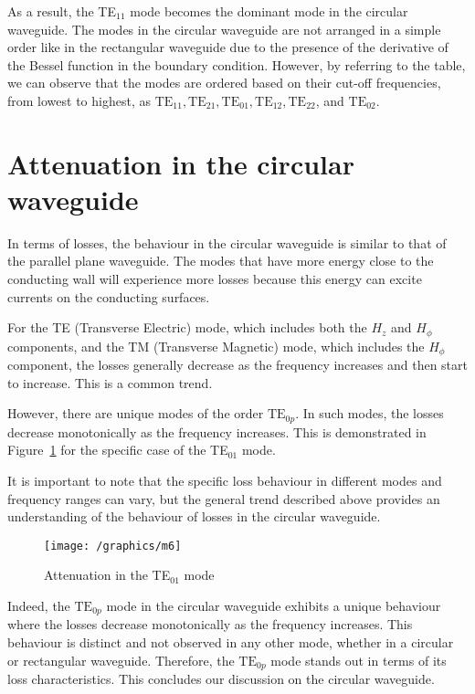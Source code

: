 As a result, the TE$_{11}$ mode becomes the dominant mode in the circular waveguide. The modes in the circular waveguide are not arranged in a simple order like in the rectangular waveguide due to the presence of the derivative of the Bessel function in the boundary condition. However, by referring to the table, we can observe that the modes are ordered based on their cut-off frequencies, from lowest to highest, as $\text{TE}_{11}, \text{TE}_{21}, \text{TE}_{01}, \text{TE}_{12}, \text{TE}_{22}$, and $\text{TE}_{02}$.

\section{Attenuation in the circular waveguide}
In terms of losses, the behaviour in the circular waveguide is similar to that of the parallel plane waveguide. The modes that have more energy close to the conducting wall will experience more losses because this energy can excite currents on the conducting surfaces. 

For the TE (Transverse Electric) mode, which includes both the $H_z$ and $H_\phi$ components, and the TM (Transverse Magnetic) mode, which includes the $H_\phi$ component, the losses generally decrease as the frequency increases and then start to increase. This is a common trend. 

However, there are unique modes of the order $\text{TE}_{0p}$. In such modes, the losses decrease monotonically as the frequency increases. This is demonstrated in Figure~\ref{fig:m6} for the specific case of the TE$_{01}$ mode.

It is important to note that the specific loss behaviour in different modes and frequency ranges can vary, but the general trend described above provides an understanding of the behaviour of losses in the circular waveguide.
\begin{figure}[h]
\centering
\texttt{[image: /graphics/m6]}
\caption{Attenuation in the TE$_{01}$ mode}
\label{fig:m6}
\end{figure}

Indeed, the $\text{TE}_{0p}$ mode in the circular waveguide exhibits a unique behaviour where the losses decrease monotonically as the frequency increases. This behaviour is distinct and not observed in any other mode, whether in a circular or rectangular waveguide. Therefore, the $\text{TE}_{0p}$ mode stands out in terms of its loss characteristics. This concludes our discussion on the circular waveguide.
